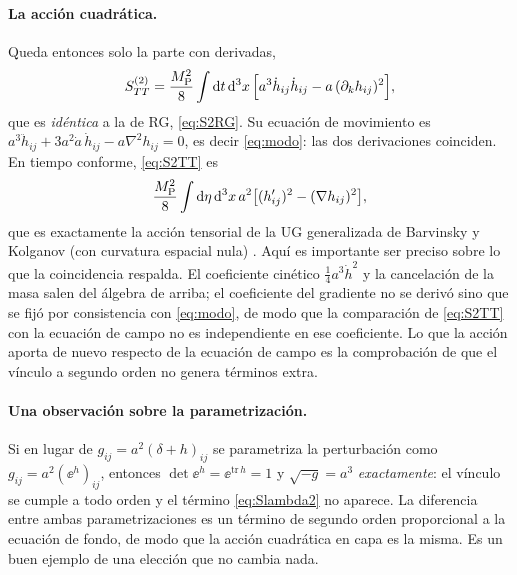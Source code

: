 \paragraph{La acción cuadrática.} Queda entonces solo la parte con derivadas,
\begin{equation}
S^{(2)}_{TT}=\frac{M_{\rm P}^2}{8}\int\mathrm d t\,\mathrm d^3x\,\Big[a^3\dot h_{ij}\dot h_{ij}-a\,(\partial_kh_{ij})^2\Big],
\label{eq:S2TT}
\end{equation}
que es \emph{idéntica} a la de RG, \eqref{eq:S2RG}. Su ecuación de movimiento es $a^3\ddot h_{ij}+3a^2\dot a\,\dot h_{ij}-a\nabla^2h_{ij}=0$, es decir \eqref{eq:modo}: las dos derivaciones coinciden. En tiempo conforme, \eqref{eq:S2TT} es
\begin{equation}
\frac{M_{\rm P}^2}{8}\int\mathrm d\eta\,\mathrm d^3x\,a^2\big[(h_{ij}')^2-(\nabla h_{ij})^2\big],
\label{eq:S2conf}
\end{equation}
que es exactamente la acción tensorial de la UG generalizada de Barvinsky y Kolganov (con curvatura espacial nula) \cite{barvinsky19}. Aquí es importante ser preciso sobre lo que la coincidencia respalda. El coeficiente cinético $\tfrac14a^3\dot h^2$ y la cancelación de la masa salen del álgebra de arriba; el coeficiente del gradiente no se derivó sino que se fijó por consistencia con \eqref{eq:modo}, de modo que la comparación de \eqref{eq:S2TT} con la ecuación de campo no es independiente en ese coeficiente. Lo que la acción aporta de nuevo respecto de la ecuación de campo es la comprobación de que el vínculo a segundo orden no genera términos extra.

\paragraph{Una observación sobre la parametrización.} Si en lugar de $g_{ij}=a^2(\delta+h)_{ij}$ se parametriza la perturbación como $g_{ij}=a^2(\ee^h)_{ij}$, entonces $\det\ee^h=\ee^{\mathrm{tr}\,h}=1$ y $\sqrt{-g}=a^3$ \emph{exactamente}: el vínculo se cumple a todo orden y el término \eqref{eq:Slambda2} no aparece. La diferencia entre ambas parametrizaciones es un término de segundo orden proporcional a la ecuación de fondo, de modo que la acción cuadrática en capa es la misma. Es un buen ejemplo de una elección que no cambia nada.

